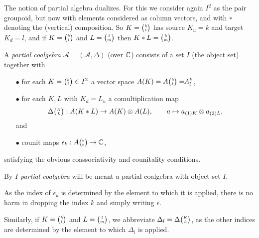 The notion of partial algebra dualizes. For this we consider again $I^2$ as the pair groupoid, but now with elements considered as column vectors, and with $*$ denoting the (vertical) composition. So $K={\tiny {\begin{pmatrix} k\\l\end{pmatrix}}}$ has source $K_u = k$ and target $K_d = l$, and if $K={\tiny {\begin{pmatrix} k\\l\end{pmatrix}}}$ and $L={\tiny {\begin{pmatrix} l\\m\end{pmatrix}}}$ then $K* L = {\tiny {\begin{pmatrix} k\\m\end{pmatrix}}}$. %

\begin{Def} A \emph{partial coalgebra} $\mathscr{A}=(\mathscr{A},\Delta)$ (over $\mathbb{C}$) consists of a set $I$ (the object set) together with 
\begin{itemize}
\item[$\bullet$] for each $K={\tiny \begin{pmatrix} k \\ l\end{pmatrix}}\in I^2$ a vector space $A(K) = A{\tiny {\begin{pmatrix} k\\l\end{pmatrix}}}=\!\!A^{k}_{l}$,
\item[$\bullet$] for each $K,L$ with $K_d = L_u$ a comultiplication map \[\Delta{\tiny {\begin{pmatrix} K\\L\end{pmatrix}}}:A(K*L)\rightarrow A(K)\otimes A(L),\qquad a \mapsto a_{(1)K}\otimes a_{(2)L},\] and 
\item[$\bullet$] counit maps $\epsilon_k:A{\tiny {\begin{pmatrix} k\\k\end{pmatrix}}}\rightarrow \mathbb{C}$,
\end{itemize} 
satisfying the obvious coassociativity and counitality conditions.

By \emph{$I$-partial coalgebra} will be meant a partial coalgebra with object set $I$.
\end{Def}

\begin{Not}\label{NotCom} As the index of $\epsilon_k$ is determined by the element to which it is applied, there is no harm in dropping the index $k$ and simply writing $\epsilon$.

Similarly, if $K = {\tiny {\begin{pmatrix} k\\l\end{pmatrix}}}$ and $L = {\tiny {\begin{pmatrix} l\\m\end{pmatrix}}}$, we abbreviate $\Delta_l = \Delta{\tiny {\begin{pmatrix} K\\L\end{pmatrix}}}$, as the other indices are determined by the element to which $\Delta_l$ is applied.
\end{Not}

